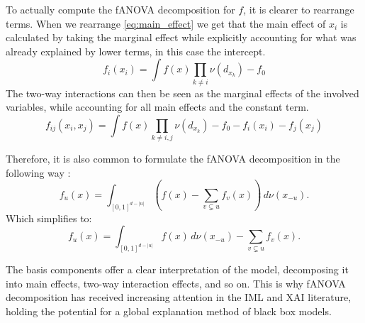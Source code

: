 To actually compute the fANOVA decomposition for $f$, it is clearer to rearrange terms. When we rearrange \autoref{eq:main_effect} we get that the main effect of $x_i$ is calculated by taking the marginal effect while explicitly accounting for what was already explained by lower terms, in this case the intercept. 
\begin{equation}
    f_i(x_i) = \int f(x) \prod_{k \neq i} \nu(d_{x_{k}}) - f_0
    \label{eq:main_effect_rearranged}
\end{equation}
The two-way interactions can then be seen as the marginal effects of the involved variables, while accounting for all main effects and the constant term. 
\begin{equation}
    f_{ij}(x_i,x_j) = \int f(x) \prod_{k \neq i,j} \nu(d_{x_{k}}) - f_0 - f_i(x_i) - f_j(x_j) 
    \label{eq:interaction_effects}
\end{equation}

Therefore, it is also common to formulate the fANOVA decomposition in the following way \citep{hooker2007,hooker2004}:
\begin{equation}
    f_u(x) = \int_{[0,1]^{d - |u|}} \left( f(x) - \sum_{v \subsetneq u} f_v(x) \right) \, d\nu(x_{-u}).
\end{equation}
Which simplifies to:
\begin{equation}
    f_u(x) = \int_{[0,1]^{d - |u|}} f(x) \, d\nu(x_{-u}) - \sum_{v \subsetneq u} f_v(x).
\end{equation}

The basis components offer a clear interpretation of the model, decomposing it into main effects, two-way interaction effects, and so on. This is why fANOVA decomposition has received increasing attention in the IML and XAI literature, holding the potential for a global explanation method of black box models.\par

